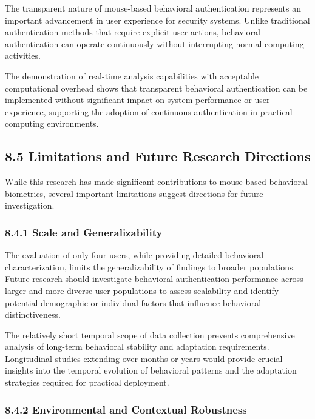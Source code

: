 \documentclass[
  11pt,
  a4paper,
]{article}
\begin{document}
The transparent nature of mouse-based behavioral authentication
represents an important advancement in user experience for security
systems. Unlike traditional authentication methods that require explicit
user actions, behavioral authentication can operate continuously without
interrupting normal computing activities.

The demonstration of real-time analysis capabilities with acceptable
computational overhead shows that transparent behavioral authentication
can be implemented without significant impact on system performance or
user experience, supporting the adoption of continuous authentication in
practical computing environments.

\subsection{8.5 Limitations and Future Research
Directions}\label{limitations-and-future-research-directions}

While this research has made significant contributions to mouse-based
behavioral biometrics, several important limitations suggest directions
for future investigation.

\subsubsection{8.4.1 Scale and
Generalizability}\label{scale-and-generalizability}

The evaluation of only four users, while providing detailed behavioral
characterization, limits the generalizability of findings to broader
populations. Future research should investigate behavioral
authentication performance across larger and more diverse user
populations to assess scalability and identify potential demographic or
individual factors that influence behavioral distinctiveness.

The relatively short temporal scope of data collection prevents
comprehensive analysis of long-term behavioral stability and adaptation
requirements. Longitudinal studies extending over months or years would
provide crucial insights into the temporal evolution of behavioral
patterns and the adaptation strategies required for practical
deployment.

\subsubsection{8.4.2 Environmental and Contextual
Robustness}\label{environmental-and-contextual-robustness}
\end{document}
